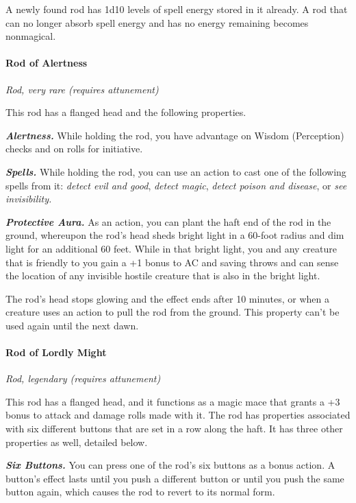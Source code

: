 \documentclass[
]{article}
\begin{document}
A newly found rod has 1d10 levels of spell energy stored in it already.
A rod that can no longer absorb spell energy and has no energy remaining
becomes nonmagical.

\hypertarget{rod-of-alertness}{%
\paragraph{Rod of Alertness}\label{rod-of-alertness}}

\emph{Rod, very rare (requires attunement)}

This rod has a flanged head and the following properties.

\emph{\textbf{Alertness.}} While holding the rod, you have advantage on
Wisdom (Perception) checks and on rolls for initiative.

\emph{\textbf{Spells.}} While holding the rod, you can use an action to
cast one of the following spells from it: \emph{detect evil and good},
\emph{detect magic}, \emph{detect poison and disease}, or \emph{see
invisibility.}

\emph{\textbf{Protective Aura.}} As an action, you can plant the haft
end of the rod in the ground, whereupon the rod's head sheds bright
light in a 60-foot radius and dim light for an additional 60 feet. While
in that bright light, you and any creature that is friendly to you gain
a +1 bonus to AC and saving throws and can sense the location of any
invisible hostile creature that is also in the bright light.

The rod's head stops glowing and the effect ends after 10 minutes, or
when a creature uses an action to pull the rod from the ground. This
property can't be used again until the next dawn.

\hypertarget{rod-of-lordly-might}{%
\paragraph{Rod of Lordly Might}\label{rod-of-lordly-might}}

\emph{Rod, legendary (requires attunement)}

This rod has a flanged head, and it functions as a magic mace that
grants a +3 bonus to attack and damage rolls made with it. The rod has
properties associated with six different buttons that are set in a row
along the haft. It has three other properties as well, detailed below.

\emph{\textbf{Six Buttons.}} You can press one of the rod's six buttons
as a bonus action. A button's effect lasts until you push a different
button or until you push the same button again, which causes the rod to
revert to its normal form.
\end{document}
